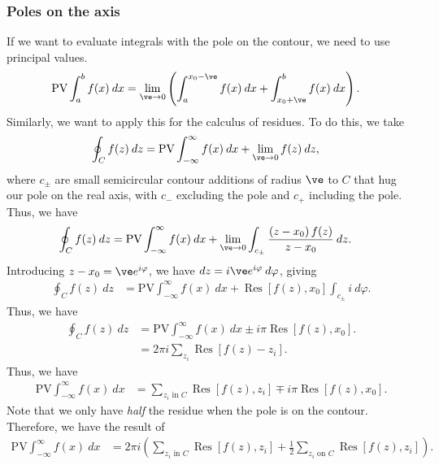 \documentclass[10pt]{mypackage}
\DeclareMathOperator{\res}{Res}
\begin{document}
   \subsubsection{Poles on the axis}%
   If we want to evaluate integrals with the pole on the contour, we need to use principal values.
   \begin{align*}
     \text{PV}\int_{a}^{b} f(x)\:dx &= \lim_{\ve \rightarrow 0}\left( \int_{a}^{x_0 - \ve} f(x)\:dx + \int_{x_0 + \ve}^{b} f(x)\:dx \right).
   \end{align*}
   Similarly, we want to apply this for the calculus of residues. To do this, we take
   \begin{align*}
     \oint_{C}f(z)\:dz &= \text{PV}\int_{-\infty}^{\infty} f(x)\:dx + \lim_{\ve\rightarrow 0}f(z)\:dz,
   \end{align*}
   where $c_{\pm}$ are small semicircular contour additions of radius $\ve$ to $C$ that hug our pole on the real axis, with $c_{-}$ excluding the pole and $c_{+}$ including the pole. Thus, we have
   \begin{align*}
     \oint_{C}f(z)\:dz &= \text{PV}\int_{-\infty}^{\infty} f(x)\:dx + \lim_{\ve\rightarrow 0} \int_{c_{\pm}}^{} \frac{\left( z-x_0 \right)f(z)}{z-x_0}\:dz.
   \end{align*}
   Introducing $z-x_0 = \ve e^{i\varphi}$, we have $dz = i\ve e^{i\varphi}\:d\varphi$, giving
   \begin{align*}
     \oint_{C} f(z)\:dz &= \text{PV}\int_{-\infty}^{\infty} f(x)\:dx + \res\left[ f(z),x_0 \right]\int_{c_{\pm}}^{} i\:d\varphi.
   \end{align*}
   Thus, we have
   \begin{align*}
     \oint_{C}f(z)\:dz &= \text{PV}\int_{-\infty}^{\infty} f(x)\:dx \pm i\pi \res\left[ f(z),x_0 \right].\\
                       &= 2\pi i \sum_{z_i}\res\left[ f(z)-z_i \right].
   \end{align*}
   Thus, we have
   \begin{align*}
     \text{PV} \int_{-\infty}^{\infty} f(x)\:dx &= \sum_{z_i\text{ in }C} \res\left[ f(z),z_i \right] \mp i\pi \res\left[ f(z),x_0 \right].
   \end{align*}
   Note that we only have \textit{half} the residue when the pole is on the contour. Therefore, we have the result of
   \begin{align*}
     \text{PV}\int_{-\infty}^{\infty} f(x)\:dx &= 2\pi i \left( \sum_{z_i\text{ in }C} \res\left[ f(z),z_i \right] + \frac{1}{2}\sum_{z_i\text{ on }C}\res\left[ f(z),z_i \right] \right).
   \end{align*}
\end{document}

